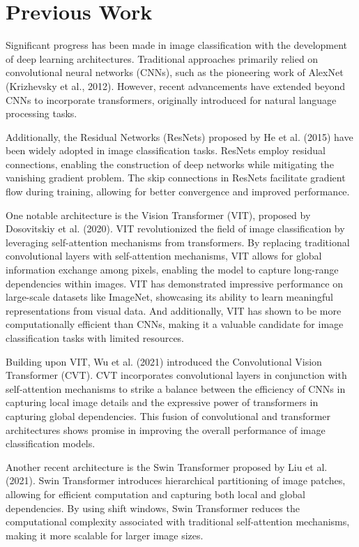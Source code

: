 \documentclass{article}
\begin{document}
\section{Previous Work}
Significant progress has been made in image classification with the development of deep learning architectures. Traditional approaches primarily relied on convolutional neural networks (CNNs), such as the pioneering work of AlexNet (Krizhevsky et al., 2012). However, recent advancements have extended beyond CNNs to incorporate transformers, originally introduced for natural language processing tasks.

Additionally, the Residual Networks (ResNets) proposed by He et al. (2015) have been widely adopted in image classification tasks. ResNets employ residual connections, enabling the construction of deep networks while mitigating the vanishing gradient problem. The skip connections in ResNets facilitate gradient flow during training, allowing for better convergence and improved performance.

One notable architecture is the Vision Transformer (VIT), proposed by Dosovitskiy et al. (2020).
VIT revolutionized the field of image classification by leveraging self-attention mechanisms from transformers.
By replacing traditional convolutional layers with self-attention mechanisms, VIT allows for global information exchange among pixels, enabling the model to capture long-range dependencies within images.
VIT has demonstrated impressive performance on large-scale datasets like ImageNet, showcasing its ability to learn meaningful representations from visual data.
And additionally, VIT has shown to be more computationally efficient than CNNs, making it a valuable candidate for image classification tasks with limited resources.

Building upon VIT, Wu et al. (2021) introduced the Convolutional Vision Transformer (CVT).
CVT incorporates convolutional layers in conjunction with self-attention mechanisms to strike a balance between the efficiency of CNNs in capturing local image details and the expressive power of transformers in capturing global dependencies.
This fusion of convolutional and transformer architectures shows promise in improving the overall performance of image classification models.

Another recent architecture is the Swin Transformer proposed by Liu et al. (2021).
Swin Transformer introduces hierarchical partitioning of image patches, allowing for efficient computation and capturing both local and global dependencies.
By using shift windows, Swin Transformer reduces the computational complexity associated with traditional self-attention mechanisms, making it more scalable for larger image sizes.
\end{document}
